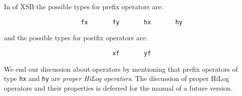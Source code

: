 In \version{} of XSB the possible types for prefix operators are:
\begin{verbatim}
                      fx       fy       hx       hy
\end{verbatim}
and the possible types for postfix operators are:
\begin{verbatim}
                               xf       yf
\end{verbatim}

We end our discussion about operators by mentioning that prefix
operators of type {\tt hx} and {\tt hy} are {\em proper HiLog
  operators}.  The discussion of proper HiLog operators and their
properties is deferred for the manual of a future version.

